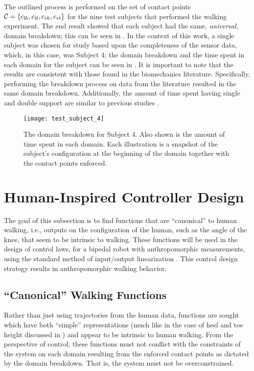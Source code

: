 The outlined process is performed on the set of contact points $\mathcal{C} =  \{c_{\mathit{lh}},
c_{\mathit{lt}}, c_{\mathit{rh}} , c_{\mathit{rt}}\}$ for the nine test subjects that performed the walking
experiment.
%
The end result showed that each subject had the same, {\em universal}, domain
breakdown; this can be seen in .
%
In the context of this work, a single subject was chosen for study based upon
the completeness of the sensor data, which, in this case, was Subject 4; the
domain breakdown and the time spent in each domain for the subject can be seen
in .
%
It is important to note that the results are consistent with those found in the biomechanics
literature.
%
Specifically, performing the breakdown process on data from the literature
\cite{Winter2009} resulted in the same domain breakdown.
%
Additionally, the amount of time spent having single and double support are
similar to previous studies \cite{Ackermann2007}.

\begin{figure}[t]
  \centering
  \texttt{[image: test\_subject\_4]}
  \caption[The domain breakdown for Subject 4.]{The domain breakdown for Subject
    4.
    Also shown is the amount of time spent in each domain.
    Each illustration is a snapshot of the subject's configuration at the
    beginning of the domain together with the contact points enforced.}
  \label{fred}
\end{figure}


\section{Human-Inspired Controller Design}

The goal of this subsection is to find functions that are ``canonical'' to human
walking, i.e., outputs on the configuration of the human, such as the angle of
the knee, that seem to be intrinsic to walking.
%
These functions will be used in the design of control laws, for a bipedal robot
with anthropomorphic measurements, using the standard method of input/output
linearization \cite{Sastry1999}.
%
This control design strategy results in anthropomorphic walking behavior.


\subsection{``Canonical'' Walking Functions} \label{sec:functions}

Rather than just using trajectories from the human data, functions are sought
which have both ``simple'' representations (much like in the case of heel and
toe height discussed in ) and appear to be intrinsic
to human walking.
%
From the perspective of control, these functions must not conflict with the
constraints of the system on each domain resulting from the enforced contact
points as dictated by the domain breakdown.
%
That is, the system must not be overconstrained.

